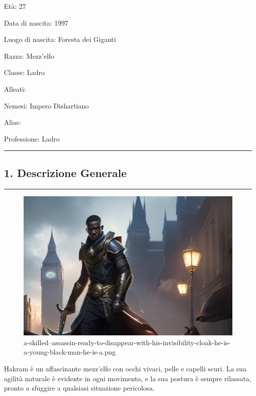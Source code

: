 Età: 27

Data di nascita: 1997

Luogo di nascita: Foresta dei Giganti

Razza: Mezz'elfo

Classe: Ladro

Alleati:

Nemesi: Impero Dishartiano

Alias:

Professione: Ladro

\begin{center}\rule{0.5\linewidth}{0.5pt}\end{center}

\subsection{1. Descrizione Generale}\label{descrizione-generale}

\begin{center}\rule{0.5\linewidth}{0.5pt}\end{center}

\begin{figure}
\centering
\includegraphics{a-skilled--assassin-ready-to-disappear-with-his-invisibility-cloak-he-is-a-young-black-man-he-is-a.png}
\caption{a-skilled--assassin-ready-to-disappear-with-his-invisibility-cloak-he-is-a-young-black-man-he-is-a.png}
\end{figure}

Hakram è un affascinante mezz'elfo con occhi vivaci, pelle e capelli
scuri. La sua agilità naturale è evidente in ogni movimento, e la sua
postura è sempre rilassata, pronto a sfuggire a qualsiasi situazione
pericolosa.


